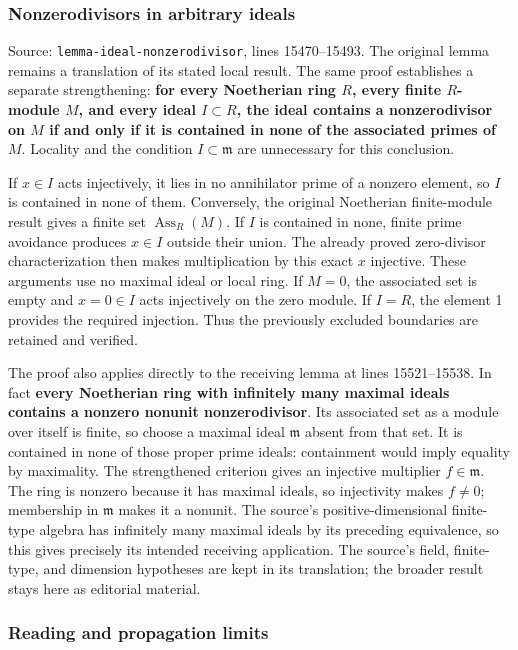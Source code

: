 \subsubsection{Nonzerodivisors in arbitrary ideals}\label{algebra-proof-004-nonzerodivisors-in-arbitrary-ideals}

Source: \texttt{lemma-ideal-nonzerodivisor}, lines 15470--15493. The original lemma remains a translation of its stated local result. The same proof establishes a separate strengthening: \textbf{for every Noetherian ring \(R\), every finite \(R\)-module \(M\), and every ideal \(I\subset R\), the ideal contains a nonzerodivisor on \(M\) if and only if it is contained in none of the associated primes of \(M\)}. Locality and the condition \(I\subset\mathfrak m\) are unnecessary for this conclusion.

If \(x\in I\) acts injectively, it lies in no annihilator prime of a nonzero element, so \(I\) is contained in none of them. Conversely, the original Noetherian finite-module result gives a finite set \(\operatorname{Ass}_R(M)\). If \(I\) is contained in none, finite prime avoidance produces \(x\in I\) outside their union. The already proved zero-divisor characterization then makes multiplication by this exact \(x\) injective. These arguments use no maximal ideal or local ring. If \(M=0\), the associated set is empty and \(x=0\in I\) acts injectively on the zero module. If \(I=R\), the element 1 provides the required injection. Thus the previously excluded boundaries are retained and verified.

The proof also applies directly to the receiving lemma at lines 15521--15538. In fact \textbf{every Noetherian ring with infinitely many maximal ideals contains a nonzero nonunit nonzerodivisor}. Its associated set as a module over itself is finite, so choose a maximal ideal \(\mathfrak m\) absent from that set. It is contained in none of those proper prime ideals: containment would imply equality by maximality. The strengthened criterion gives an injective multiplier \(f\in\mathfrak m\). The ring is nonzero because it has maximal ideals, so injectivity makes \(f\ne0\); membership in \(\mathfrak m\) makes it a nonunit. The source's positive-dimensional finite-type algebra has infinitely many maximal ideals by its preceding equivalence, so this gives precisely its intended receiving application. The source's field, finite-type, and dimension hypotheses are kept in its translation; the broader result stays here as editorial material.

\subsubsection{Reading and propagation limits}\label{algebra-proof-004-reading-and-propagation-limits}

